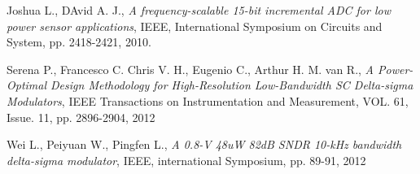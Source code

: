 \begin{thebibliography}{9}
Joshua L., DAvid A. J., 
\textit{A frequency-scalable 15-bit incremental ADC for low power sensor applications},
IEEE, International Symposium on Circuits and System, pp. 2418-2421, 2010.

Serena P., Francesco C. Chris V. H., Eugenio C., Arthur H. M. van R., 
\textit{A Power-Optimal Design Methodology for High-Resolution Low-Bandwidth SC Delta-sigma Modulators},
IEEE Transactions on Instrumentation and Measurement, VOL. 61, Issue. 11, pp. 2896-2904, 2012

Wei L., Peiyuan W., Pingfen L.,
\textit{A 0.8-V 48uW 82dB SNDR 10-kHz bandwidth delta-sigma modulator},
IEEE, international Symposium, pp. 89-91, 2012
\end{thebibliography}

